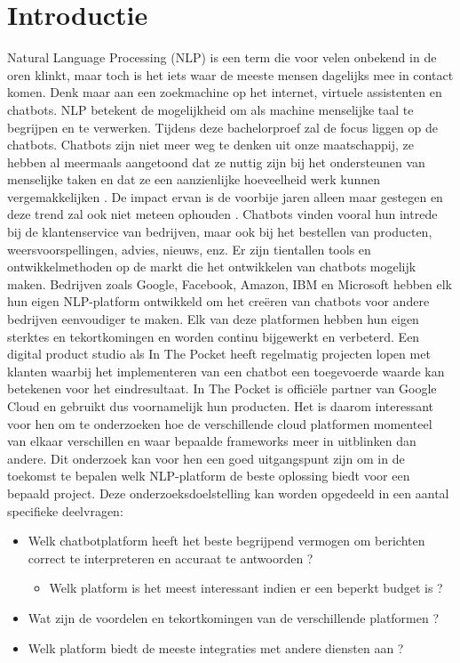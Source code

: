 
\section{Introductie} %
\label{sec:introductie}
Natural Language Processing (NLP) is een term die voor velen onbekend in de oren klinkt, maar toch is het iets waar de meeste mensen dagelijks mee in contact komen. Denk maar aan een zoekmachine op het internet, virtuele assistenten en chatbots. NLP betekent de mogelijkheid om als machine menselijke taal te begrijpen en te verwerken. Tijdens deze bachelorproef zal de focus liggen op de chatbots. Chatbots zijn niet meer weg te denken uit onze maatschappij, ze hebben al meermaals aangetoond dat ze nuttig zijn bij het ondersteunen van menselijke taken en dat ze een aanzienlijke hoeveelheid werk kunnen vergemakkelijken \autocite{Atwell2007}.  De impact ervan is de voorbije jaren alleen maar gestegen en deze trend zal ook niet meteen ophouden \autocite{BRAIN2019}. Chatbots vinden vooral hun intrede bij de klantenservice van bedrijven, maar ook bij het bestellen van producten, weersvoorspellingen, advies, nieuws, enz. Er zijn tientallen tools en ontwikkelmethoden op de markt die het ontwikkelen van chatbots mogelijk maken. Bedrijven zoals Google, Facebook, Amazon, IBM en Microsoft hebben elk hun eigen NLP-platform ontwikkeld om het creëren van chatbots voor andere bedrijven eenvoudiger te maken. Elk van deze platformen hebben hun eigen sterktes en tekortkomingen en worden continu bijgewerkt en verbeterd. Een digital product studio als In The Pocket heeft regelmatig projecten lopen met klanten waarbij het implementeren van een chatbot een toegevoerde waarde kan betekenen voor het eindresultaat. In The Pocket is officiële partner van Google Cloud en gebruikt dus voornamelijk hun producten. Het is daarom interessant voor hen om te onderzoeken hoe de verschillende cloud platformen momenteel van elkaar verschillen en waar bepaalde frameworks meer in uitblinken dan andere. Dit onderzoek kan voor hen een goed uitgangspunt zijn om in de toekomst te bepalen welk NLP-platform de beste oplossing biedt voor een bepaald project. Deze onderzoeksdoelstelling kan worden opgedeeld in een aantal specifieke deelvragen:
\bigskip
\begin{itemize}
  \item Welk chatbotplatform heeft het beste begrijpend vermogen om berichten correct te interpreteren en accuraat te antwoorden ? 
  \begin{itemize}
      \item Welk platform is het meest interessant indien er een beperkt budget is ?
  \end{itemize}
  \item Wat zijn de voordelen en tekortkomingen van de verschillende platformen ?
  \item Welk platform biedt de meeste integraties met andere diensten aan ?
\end{itemize}

